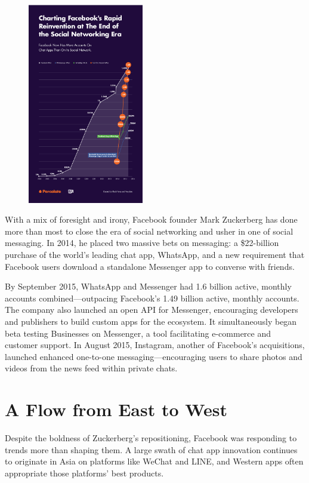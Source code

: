 \documentclass[notoc, symmetric, nobib, nols]{towcenter-guideto-book}
\begin{document}
\begin{figure}
\includegraphics[width=0.45\textwidth]{graphics/CHATAPPS_Page9_Graph.png}
\end{figure}

With a mix of foresight and irony, Facebook founder Mark Zuckerberg has done more than most to close the era of social networking and usher in one of social messaging. In 2014, he placed two massive bets on messaging: a \$22-billion purchase of the world's leading chat app, WhatsApp, and a new requirement that Facebook users download a standalone Messenger app to converse with friends.  

By September 2015, WhatsApp and Messenger had 1.6 billion active, monthly accounts combined---outpacing Facebook's 1.49 billion active, monthly accounts. The company also launched an open API for Messenger, encouraging developers and publishers to build custom apps for the ecosystem. It simultaneously began beta testing Businesses on Messenger, a tool facilitating e-commerce and customer support. In August 2015, Instagram, another of Facebook's acquisitions, launched enhanced one-to-one messaging---encouraging users to share photos and videos from the news feed within private chats. 

\section{A Flow from East to West}

Despite the boldness of Zuckerberg's repositioning, Facebook was responding to trends more than shaping them. A large swath of chat app innovation continues to originate in Asia on platforms like WeChat and LINE, and Western apps often appropriate those platforms' best products.
\end{document}
